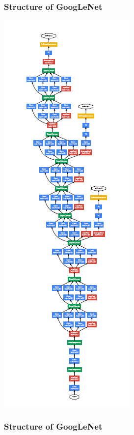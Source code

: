 \begin{frame}[allowframebreaks]
	\frametitle{Structure of GoogLeNet}

	\begin{center}
		\includegraphics[scale=0.7]{figs/GoogLeNet_scheme}
	\end{center}

	\framebreak

	\frametitle{Structure of GoogLeNet}
	\begin{columns} %


\end{columns}
\end{frame}

